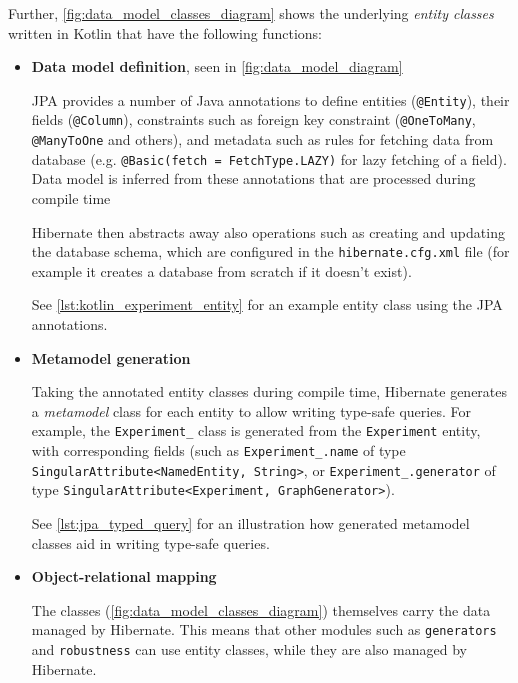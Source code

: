 Further, \autoref{fig:data_model_classes_diagram} shows the underlying \textsl{entity classes} written in Kotlin that have the following functions:
\begin{itemize}[topsep=5pt,label=$\bm{\rightarrow}$]
    \item \textbf{Data model definition}, seen in \autoref{fig:data_model_diagram}

    JPA provides a number of Java annotations to define entities (\texttt{@Entity}), their fields (\texttt{@Column}), constraints such as foreign key constraint (\texttt{@OneToMany}, \texttt{@ManyToOne} and others), and metadata such as rules for fetching data from database (e.g. \texttt{@Basic(fetch = FetchType.LAZY)} for lazy fetching of a field).
    Data model is inferred from these annotations that are processed during compile time

    Hibernate then abstracts away also operations such as creating and updating the database schema, which are configured in the \texttt{hibernate.cfg.xml} file (for example it creates a database from scratch if it doesn't exist).

    See \autoref{lst:kotlin_experiment_entity} for an example entity class using the JPA annotations.

    \item \textbf{Metamodel generation}

    Taking the annotated entity classes during compile time, Hibernate generates a \textsl{metamodel} class for each entity to allow writing type-safe queries.
    For example, the \texttt{Experiment\_} class is generated from the \texttt{Experiment} entity, with corresponding fields (such as \texttt{Experiment\_.name} of type \texttt{SingularAttribute<NamedEntity, String>}, or \texttt{Experiment\_.generator} of type \texttt{SingularAttribute<Experiment, GraphGenerator>}).

    See \autoref{lst:jpa_typed_query} for an illustration how generated metamodel classes aid in writing type-safe queries.

    

    \item \textbf{Object-relational mapping}

    The classes (\autoref{fig:data_model_classes_diagram}) themselves carry the data managed by Hibernate.
    This means that other modules such as \texttt{generators} and \texttt{robustness} can use entity classes, while they are also managed by Hibernate.


\end{itemize}
